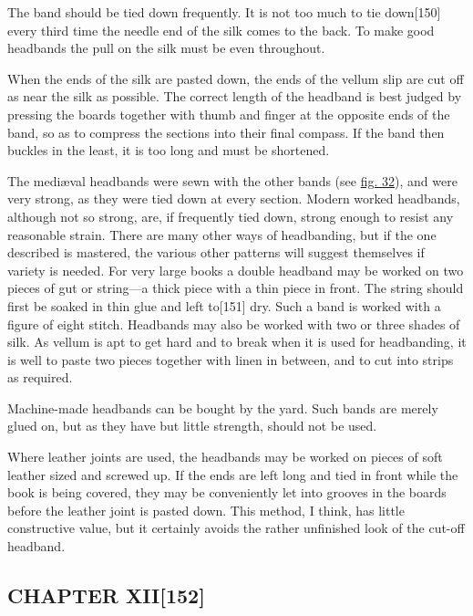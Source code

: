 \documentclass[
]{article}
\begin{document}
The band should be tied down frequently. It is not too much to tie
down{\protect\hypertarget{Page_150}{}{{[}150{]}}} every third time the
needle end of the silk comes to the back. To make good headbands the
pull on the silk must be even throughout.

When the ends of the silk are pasted down, the ends of the vellum slip
are cut off as near the silk as possible. The correct length of the
headband is best judged by pressing the boards together with thumb and
finger at the opposite ends of the band, so as to compress the sections
into their final compass. If the band then buckles in the least, it is
too long and must be shortened.

The mediæval headbands were sewn with the other bands (see
\protect\hyperlink{Fig_32}{fig. 32}), and were very strong, as they were
tied down at every section. Modern worked headbands, although not so
strong, are, if frequently tied down, strong enough to resist any
reasonable strain. There are many other ways of headbanding, but if the
one described is mastered, the various other patterns will suggest
themselves if variety is needed. For very large books a double headband
may be worked on two pieces of gut or string---a thick piece with a thin
piece in front. The string should first be soaked in thin glue and left
to{\protect\hypertarget{Page_151}{}{{[}151{]}}} dry. Such a band is
worked with a figure of eight stitch. Headbands may also be worked with
two or three shades of silk. As vellum is apt to get hard and to break
when it is used for headbanding, it is well to paste two pieces together
with linen in between, and to cut into strips as required.

Machine-made headbands can be bought by the yard. Such bands are merely
glued on, but as they have but little strength, should not be used.

Where leather joints are used, the headbands may be worked on pieces of
soft leather sized and screwed up. If the ends are left long and tied in
front while the book is being covered, they may be conveniently let into
grooves in the boards before the leather joint is pasted down. This
method, I think, has little constructive value, but it certainly avoids
the rather unfinished look of the cut-off headband.

\hypertarget{chapter-xii152}{%
\subsection[CHAPTER
XII]{\texorpdfstring{\protect\hypertarget{CHAPTER_XII}{}{}CHAPTER
XII{\protect\hypertarget{Page_152}{}{{[}152{]}}}}{CHAPTER XII{[}152{]}}}\label{chapter-xii152}}
\end{document}
